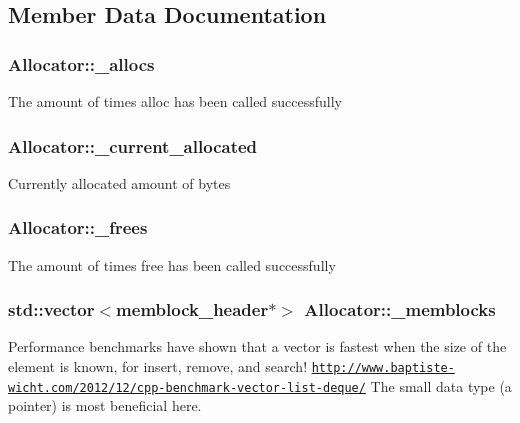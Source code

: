 \subsection{Member Data Documentation}
\subsubsection[{\-\_\-allocs}]{ Allocator\-::\-\_\-allocs\hspace{0.3cm}{\ttfamily [private]}}\label{class_allocator_aab4bbddc6f90d86d41d9884dc9815be3}
The amount of times alloc has been called successfully 
\subsubsection[{\-\_\-current\-\_\-allocated}]{ Allocator\-::\-\_\-current\-\_\-allocated\hspace{0.3cm}{\ttfamily [private]}}\label{class_allocator_a67b52b7b9bd22b33661529c5743fe2d9}
Currently allocated amount of bytes 
\subsubsection[{\-\_\-frees}]{ Allocator\-::\-\_\-frees\hspace{0.3cm}{\ttfamily [private]}}\label{class_allocator_a2b00d5fffca1bc0ba5fc82cffc582799}
The amount of times free has been called successfully 
\subsubsection[{\-\_\-memblocks}]{\setlength{\rightskip}{0pt plus 5cm}std\-::vector$<${\bf memblock\-\_\-header}$\ast$$>$ Allocator\-::\-\_\-memblocks\hspace{0.3cm}{\ttfamily [private]}}\label{class_allocator_a14b439fa46e392aca969b4c4cf99fd19}
Performance benchmarks have shown that a vector is fastest when the size of the element is known, for insert, remove, and search! \href{http://www.baptiste-wicht.com/2012/12/cpp-benchmark-vector-list-deque/}{\tt http\-://www.\-baptiste-\/wicht.\-com/2012/12/cpp-\/benchmark-\/vector-\/list-\/deque/} The small data type (a pointer) is most beneficial here. 
